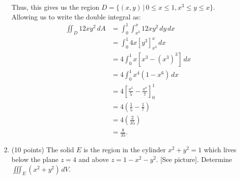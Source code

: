 \documentclass[11pt]{article}
\begin{document}
\begin{enumerate}
{          Thus, this gives us the region \(D = \{(x,y) \, | \, 0 \leq x \leq 1, x^{3} \leq y \leq x\}\). \\

          Allowing us to write the double integral as:
          \begin{align*}
            \iint_{D} 12xy^{2} \, dA & = \int_{0}^{1} \int_{x^{3}}^{x} 12xy^{2} \, dy \, dx                            \\
                                     & = \int_{0}^{1} 4x \left[ y^{3} \right]_{x^{3}}^{x} \, dx     \\
                                     & = 4\int_{0}^{1} x \left[ x^{3} - (x^{3})^{3} \right] \, dx \\
                                     & = 4\int_{0}^{1} x^{4}(1 - x^{6}) \, dx                                          \\
                                     & = 4\left[ \frac{x^{5}}{5} - \frac{x^{7}}{7} \right]_{0}^{1}                     \\
                                     & = 4\left( \frac{1}{5} - \frac{1}{7} \right)                                     \\
                                     & = 4\left( \frac{2}{35} \right)                                                  \\
                                     & = \boxed{\frac{8}{35}}.
          \end{align*}
        }
\newpage
  \item (10 points) The solid \(E\) is the region in the cylinder \(x^{2} + y^{2} = 1\) which lives below the plane \(z = 4\) and above \(z = 1 - x^{2} - y^{2}\). [See picture]. Determine \(\iiint_{E} (x^{2} + y^{2}) \, dV\).


\end{enumerate}
\end{document}
